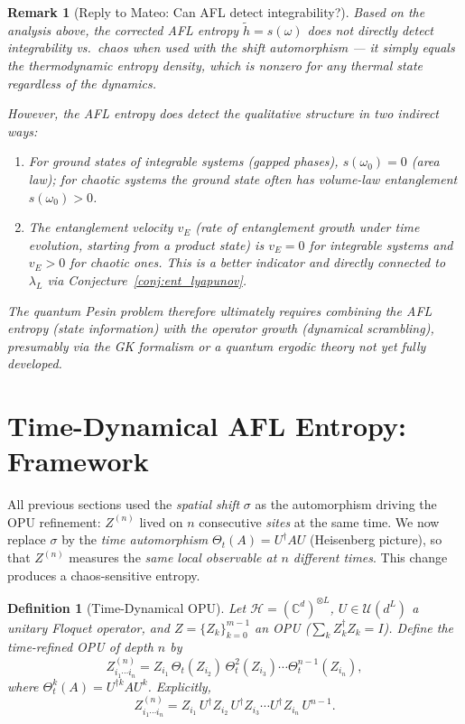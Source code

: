 \documentclass[12pt,a4paper]{article}
\newtheorem{definition}[theorem]{Definition}
\newtheorem{remark}[theorem]{Remark}
\begin{document}
\begin{remark}[Reply to Mateo: Can AFL detect integrability?]
  Based on the analysis above, the corrected AFL entropy $\widetilde{h} = s(\omega)$
  does \emph{not} directly detect integrability vs.\ chaos when used with the shift
  automorphism — it simply equals the thermodynamic entropy density, which is nonzero
  for any thermal state regardless of the dynamics.

  However, the AFL entropy \emph{does} detect the qualitative structure in two indirect
  ways:
  \begin{enumerate}
    \item For \emph{ground states} of integrable systems (gapped phases), $s(\omega_0)
          = 0$ (area law); for chaotic systems the ground state often has volume-law
          entanglement $s(\omega_0) > 0$.
    \item The \emph{entanglement velocity} $v_E$ (rate of entanglement growth under
          time evolution, starting from a product state) is $v_E = 0$ for integrable
          systems and $v_E > 0$ for chaotic ones.  This is a better indicator and
          directly connected to $\lambda_L$ via Conjecture~\ref{conj:ent_lyapunov}.
  \end{enumerate}
  The quantum Pesin problem therefore ultimately requires combining the AFL
  entropy (state information) with the operator growth (dynamical scrambling),
  presumably via the GK formalism or a quantum ergodic theory not yet fully
  developed.
\end{remark}

\section{Time-Dynamical AFL Entropy: Framework}
\label{sec:time_afl}

All previous sections used the \emph{spatial shift} $\sigma$ as the
automorphism driving the OPU refinement: $Z^{(n)}$ lived on $n$ consecutive
\emph{sites} at the same time.  We now replace $\sigma$ by the
\emph{time automorphism} $\Theta_t(A)=U^{\dagger}AU$ (Heisenberg picture),
so that $Z^{(n)}$ measures the \emph{same local observable at $n$ different
times}.  This change produces a chaos-sensitive entropy.

\begin{definition}[Time-Dynamical OPU]
Let $\mathcal{H}=(\mathbb{C}^d)^{\otimes L}$, $U\in\mathcal{U}(d^L)$ a
unitary Floquet operator, and $Z=\{Z_k\}_{k=0}^{m-1}$ an OPU
($\sum_k Z_k^{\dagger}Z_k=I$).  Define the \emph{time-refined} OPU of depth
$n$ by
\[
  Z^{(n)}_{i_1\cdots i_n}
  = Z_{i_1}\,\Theta_t(Z_{i_2})\,\Theta_t^2(Z_{i_3})\cdots
    \Theta_t^{n-1}(Z_{i_n}),
\]
where $\Theta_t^k(A)=U^{\dagger k}AU^k$.  Explicitly,
\[
  Z^{(n)}_{i_1\cdots i_n}
  = Z_{i_1}\,U^{\dagger}Z_{i_2}\,U^{\dagger}Z_{i_3}\cdots U^{\dagger}Z_{i_n}\,U^{n-1}.
\]
\end{definition}
\end{document}
